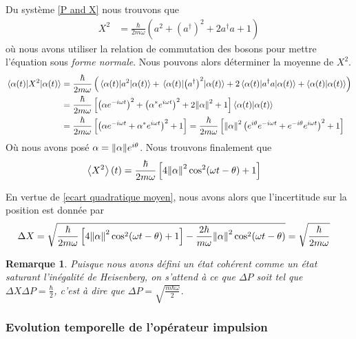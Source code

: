 \documentclass[11pt,oneside,a4paper]{article}
\newcommand{\h}{\ensuremath{\hbar}}
\newtheorem{remark}[theorem]{Remarque}
\begin{document}
Du système \eqref{P and X} nous trouvons que 
\begin{align}
  X^2 &= \frac{\h}{2m\omega}\left(a^2+\left(a^\dagger\right)^2+2a^\dagger a+1\right)
\end{align}
où nous avons utiliser la relation de commutation des bosons pour mettre l'équation sous \emph{forme normale}. Nous pouvons alors déterminer la moyenne de $X^2$.
\begin{align}
  \expval{X^2}{\alpha(t)} &= \frac{\h}{2m\omega} \left(\expval{a^2}{\alpha(t)}+\expval{\left(a^\dagger\right)^2}{\alpha(t)}+2\expval{a^\dagger a}{\alpha(t)}+\braket{\alpha(t)}\right)\\
  &= \frac{\h}{2m\omega}\left[\left(\alpha e^{-i\omega t}\right)^2+\left(\alpha^*e^{i\omega t}\right)^2 +2\norm{\alpha}^2+1\right]\braket{\alpha(t)}\\
  &= \frac{\h}{2m\omega}\left[\left(\alpha e^{-i\omega t}+\alpha^*e^{i\omega t}\right)^2+1\right] = \frac{\h}{2m\omega}\left[\norm{\alpha}^2\left(e^{i\theta}e^{-i\omega t}+e^{-i\theta}e^{i\omega t}\right)^2+1\right]\label{Mean X^2}
\end{align}
Où nous avons posé $\alpha = \norm{\alpha}e^{i\theta}$. Nous trouvons finalement que 
\begin{align}
  \expval{X^2}(t) &= \frac{\h}{2m\omega}\left[4\norm{\alpha}^2\cos^2(\omega t-\theta)+1\right]
\end{align}

En vertue de \eqref{ecart quadratique moyen}, nous avons alors que l'incertitude sur la position est donnée par
\begin{align}
  \Delta X &= \sqrt{\frac{\h}{2m\omega}\left[4\norm{\alpha}^2\cos^2(\omega t-\theta)+1\right] - \frac{2\h}{m\omega}\norm{\alpha}^2\cos^2(\omega t-\theta)} = \sqrt{\frac{\h}{2m\omega}}
\end{align}

\begin{remark}
  Puisque nous avons défini un état cohérent comme un état saturant l'inégalité de Heisenberg, on s'attend à ce que $\Delta P$ soit tel que $\Delta X\Delta P = \frac{\h}{2}$, c'est à dire que $\Delta P = \sqrt{\frac{m\h\omega}{2}}$.
\end{remark}

\subsubsection{Evolution temporelle de l'opérateur impulsion}
\label{Evolution temporelle de l'opérateur impulsion}
\end{document}
